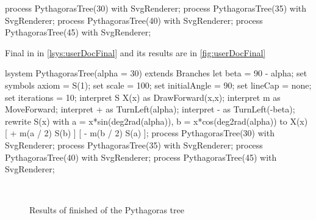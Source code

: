 \begin{Lsystem}
process PythagorasTree(30) with SvgRenderer;
process PythagorasTree(35) with SvgRenderer;
process PythagorasTree(40) with SvgRenderer;
process PythagorasTree(45) with SvgRenderer;
\end{Lsystem}

Final \lsystem in in \autoref{lsys:userDocFinal} and its results are in \autoref{fig:userDocFinal}

\begin{Lsystem}[label=lsys:userDocFinal,caption={Final \lsystem of the Pythagoras tree}]
lsystem PythagorasTree(alpha = 30) extends Branches{
	let beta = 90 - alpha;
	set symbols axiom = S(1);
	set scale = 100;
	set initialAngle = 90;
	set lineCap = none;
	set iterations = 10;
	interpret S X(x) as DrawForward(x,x);
	interpret m as MoveForward;
	interpret + as TurnLeft(alpha);
	interpret - as TurnLeft(-beta);
	rewrite S(x)
		with a = x*sin(deg2rad(alpha)), b = x*cos(deg2rad(alpha))
		to X(x) [ + m(a / 2) S(b) ] [ - m(b / 2) S(a) ];
}
process PythagorasTree(30) with SvgRenderer;
process PythagorasTree(35) with SvgRenderer;
process PythagorasTree(40) with SvgRenderer;
process PythagorasTree(45) with SvgRenderer;
\end{Lsystem}

\begin{figure}[h!]
	\centering
	 \hspace{5mm}
	\\
	 \hspace{5mm}
	\caption{Results of finished \lsystem of the Pythagoras tree}
	\label{fig:userDocFinal}
\end{figure}






















